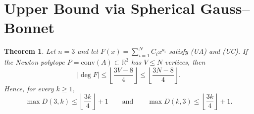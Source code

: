 \documentclass[11pt]{article}
\newtheorem{theorem}{Theorem}
\begin{document}
\section{Upper Bound via Spherical Gauss--Bonnet}

\begin{theorem}\label{thm:main}
Let $n=3$ and let $F(x)=\sum_{i=1}^N C_i x^{a_i}$ satisfy \textup{(UA)} and \textup{(UC)}. If the Newton polytope $P=\mathrm{conv}(A)\subset\mathbb{R}^3$ has $V\le N$ vertices, then
\[
|\deg F| \le \left\lfloor \frac{3V-8}{4} \right\rfloor \le \left\lfloor \frac{3N-8}{4} \right\rfloor.
\]
Hence, for every $k\ge 1$,
\[
\max D(3,k) \le \left\lfloor \frac{3k}{4} \right\rfloor + 1
\qquad\text{and}\qquad
\max D(k,3) \le \left\lfloor \frac{3k}{4} \right\rfloor + 1.
\]
\end{theorem}
\end{document}
